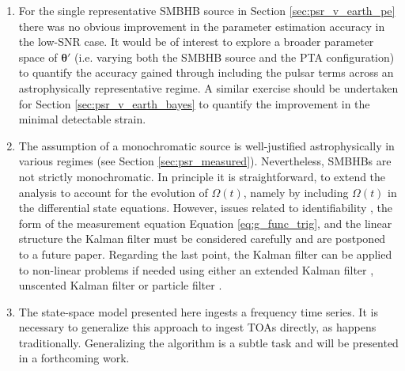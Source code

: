 \documentclass[fleqn,usenatbib,useAMS]{mnras}
\begin{document}
\begin{enumerate}[leftmargin=2em]
		
	\item For the single representative SMBHB source in Section \ref{sec:psr_v_earth_pe} there was no obvious improvement in the parameter estimation accuracy in the low-SNR case. It would be of interest to explore a broader parameter space of $\boldsymbol{\theta}'$ (i.e. varying both the SMBHB source and the PTA configuration) to quantify the accuracy gained through including the pulsar terms across an astrophysically representative regime. A similar exercise should be undertaken for Section \ref{sec:psr_v_earth_bayes} to quantify the improvement in the minimal detectable strain. \newline 
	
	\item The assumption of a monochromatic source is well-justified astrophysically in various regimes (see Section \ref{sec:psr_measured}).  Nevertheless, SMBHBs are not strictly monochromatic. In principle it is straightforward, to extend the analysis to account for the evolution of $\Omega(t)$, namely by including $\Omega(t)$ in the differential state equations. However, issues related to identifiability \citep{e5be7c83a0d24500826f6e1b414d1733}, the form of the measurement equation Equation \eqref{eq:g_func_trig}, and the linear structure the Kalman filter must be considered carefully and are postponed to a future paper. Regarding the last point, the Kalman filter can be applied to non-linear problems if needed using either an extended Kalman filter \citep{zarchan2000fundamentals}, unscented Kalman filter \citep{882463van} or particle filter \citep{Simon10}. \newline 
	
	
	\item The state-space model presented here ingests a frequency time series. It is necessary to generalize this approach to ingest TOAs directly, as happens traditionally. Generalizing the algorithm is a subtle task and will be presented in a forthcoming work. \newline
	

\end{enumerate}
\end{document}

